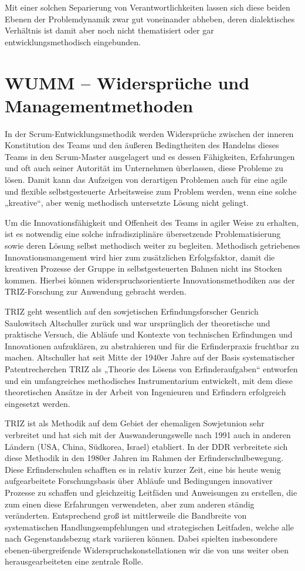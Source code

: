 \documentclass[a4paper,11pt]{article}
\begin{document}
Mit einer solchen Separierung von Verantwortlichkeiten lassen sich diese
beiden Ebenen der Problemdynamik zwar gut voneinander abheben, deren
dialektisches Verhältnis ist damit aber noch nicht thematisiert oder gar
entwicklungsmethodisch eingebunden.

\section*{WUMM – Widersprüche und Managementmethoden}

In der Scrum-Entwicklungsmethodik werden Widersprüche zwischen der inneren
Konstitution des Teams und den äußeren Bedingtheiten des Handelns dieses Teams
in den Scrum-Master ausgelagert und es dessen Fähigkeiten, Erfahrungen und oft
auch seiner Autorität im Unternehmen überlassen, diese Probleme zu
lösen. Damit kann das Aufzeigen von derartigen Problemen auch für eine agile
und flexible selbstgesteuerte Arbeitsweise zum Problem werden, wenn eine
solche „kreative“, aber wenig methodisch untersetzte Lösung nicht gelingt.

Um die Innovationsfähigkeit und Offenheit des Teams in agiler Weise zu
erhalten, ist es notwendig eine solche infradisziplinäre übersetzende
Problematisierung sowie deren Lösung selbst methodisch weiter zu
begleiten. Methodisch getriebenes Innovationsmangement wird hier zum
zusätzlichen Erfolgsfaktor, damit die kreativen Prozesse der Gruppe in
selbstgesteuerten Bahnen nicht ins Stocken kommen. Hierbei können
widerspruchsorientierte Innovationsmethodiken aus der TRIZ-Forschung zur
Anwendung gebracht werden.

TRIZ geht wesentlich auf den sowjetischen Erfindungsforscher Genrich
Saulowitsch Altschuller zurück und war ursprünglich der theoretische und
praktische Versuch, die Abläufe und Kontexte von technischen Erfindungen und
Innovationen aufzuklären, zu abstrahieren und für die Erfinderpraxis fruchtbar
zu machen. Altschuller hat seit Mitte der 1940er Jahre auf der Basis
systematischer Patentrecherchen TRIZ als „Theorie des Lösens von
Erfinderaufgaben“ entworfen und ein umfangreiches methodisches Instrumentarium
entwickelt, mit dem diese theoretischen Ansätze in der Arbeit von Ingenieuren
und Erfindern erfolgreich eingesetzt werden.

TRIZ ist als Methodik auf dem Gebiet der ehemaligen Sowjetunion sehr
verbreitet und hat sich mit der Auswanderungswelle nach 1991 auch in anderen
Ländern (USA, China, Südkorea, Israel) etabliert. In der DDR verbreitete sich
diese Methodik in den 1980er Jahren im Rahmen der Erfinderschulbewegung. Diese
Erfinderschulen schafften es in relativ kurzer Zeit, eine bis heute wenig
aufgearbeitete Forschungsbasis über Abläufe und Bedingungen innovativer
Prozesse zu schaffen und gleichzeitig Leitfäden und Anweisungen zu erstellen,
die zum einen diese Erfahrungen verwendeten, aber zum anderen ständig
veränderten. Entsprechend groß ist mittlerweile die Bandbreite von
systematischen Handlungsempfehlungen und strategischen Leitfaden, welche alle
nach Gegenstandsbezug stark variieren können. Dabei spielten insbesondere
ebenen-übergreifende Widerspruchskonstellationen wir die von uns weiter oben
herausgearbeiteten eine zentrale Rolle.
\end{document}
